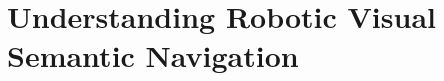\chapter{Understanding Robotic Visual Semantic Navigation}\label{ch:understanding-robotic-visual-semantic-navigation}